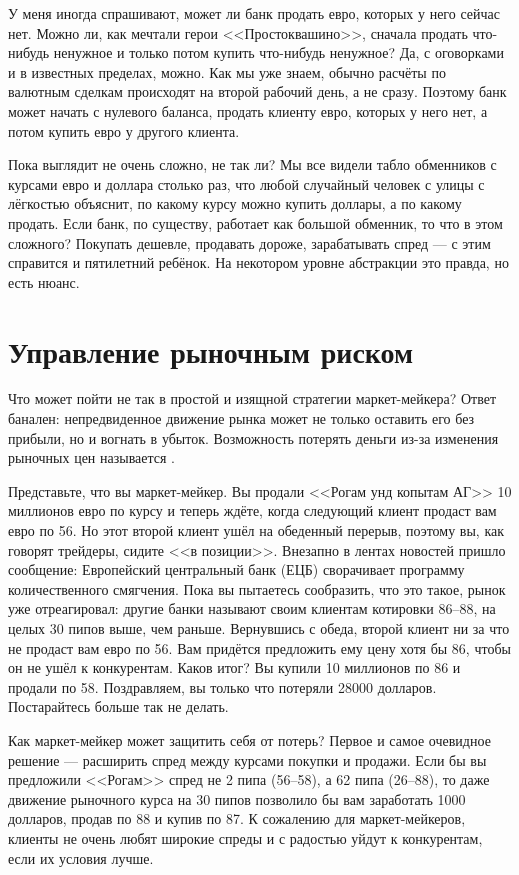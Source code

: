У меня иногда спрашивают, может ли банк продать евро, которых у него сейчас нет.
Можно ли, как мечтали герои <<Простоквашино>>, сначала продать что-нибудь
ненужное и только потом купить что-нибудь ненужное? Да, с оговорками и в
известных пределах, можно. Как мы уже знаем, обычно расчёты по валютным сделкам
происходят на второй рабочий день, а не сразу. Поэтому банк может начать с
нулевого баланса, продать клиенту евро, которых у него нет, а потом купить евро
у другого клиента.

Пока выглядит не очень сложно, не так ли? Мы все видели табло обменников с
курсами евро и доллара столько раз, что любой случайный человек с улицы с
лёгкостью объяснит, по какому курсу можно купить доллары, а по какому продать.
Если банк, по существу, работает как большой обменник, то что в этом сложного?
Покупать дешевле, продавать дороже, зарабатывать спред --- с этим справится и
пятилетний ребёнок. На некотором уровне абстракции это правда, но есть нюанс.

\section*{Управление рыночным риском}

Что может пойти не так в простой и изящной стратегии маркет-мейкера? Ответ
банален: непредвиденное движение рынка может не только оставить его без прибыли,
но и вогнать в убыток. Возможность потерять деньги из-за изменения рыночных цен
называется .

Представьте, что вы маркет-мейкер. Вы продали <<Рогам унд копытам АГ>> 10
миллионов евро по курсу  и теперь ждёте, когда следующий
клиент продаст вам евро по 56. Но этот второй клиент ушёл на обеденный перерыв,
поэтому вы, как говорят трейдеры, сидите <<в позиции>>. Внезапно в лентах
новостей пришло сообщение: Европейский центральный банк (ЕЦБ) сворачивает
программу количественного смягчения. Пока вы пытаетесь сообразить, что это
такое, рынок уже отреагировал: другие банки называют своим клиентам котировки
86--88, на целых 30 пипов выше, чем раньше. Вернувшись с обеда, второй клиент ни
за что не продаст вам евро по 56. Вам придётся предложить ему цену хотя бы 86,
чтобы он не ушёл к конкурентам. Каков итог? Вы купили 10 миллионов по 86 и
продали по 58. Поздравляем, вы только что потеряли \num{28 000} долларов.
Постарайтесь больше так не делать.

Как маркет-мейкер может защитить себя от потерь? Первое и самое очевидное
решение --- расширить спред между курсами покупки и продажи. Если бы вы
предложили <<Рогам>> спред не 2 пипа (56--58), а 62 пипа (26--88), то даже
движение рыночного курса на 30 пипов позволило бы вам заработать \num{1000}
долларов, продав по 88 и купив по 87. К сожалению для маркет-мейкеров, клиенты
не очень любят широкие спреды и с радостью уйдут к конкурентам, если их условия
лучше.

